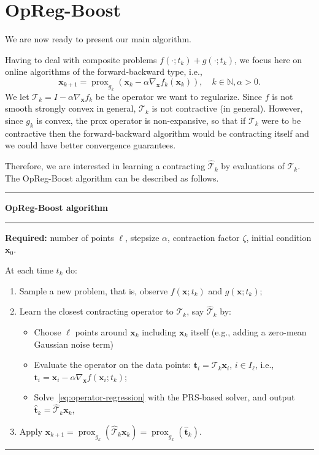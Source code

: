 \documentclass{article}
\DeclareMathOperator{\prox}{prox}
\newcommand{\N}{\mathbb{N}}
\newcommand{\tv}{\mathbold{t}}
\newcommand{\x}{\mathbold{x}}
\newcommand{\T}{\mathcal{T}}
\begin{document}
\section{OpReg-Boost}\label{sec:online-opreg}

We are now ready to present our main algorithm. 

Having to deal with composite problems $f(\cdot; t_k) + g(\cdot; t_k)$, we focus here on online algorithms of the forward-backward type, i.e., 
\begin{equation}
\x_{k+1} = \prox_{g_k} (\x_k - \alpha \nabla_{\x} f_k(\x_k)), \quad k \in \N, \alpha >0.
\end{equation}
We let $\T_k = I - \alpha \nabla_{\x} f_k$ be the operator we want to regularize. Since $f$ is not smooth strongly convex in general, $\T_k$ is not contractive (in general). However, since $g_k$ is convex, the prox operator is non-expansive, so that if $\T_k$ were to be contractive then the forward-backward algorithm would be contracting itself and we could have better convergence guarantees. 

Therefore, we are interested in learning a contracting $\hat{\T}_k$ by evaluations of $\T_k$. The OpReg-Boost algorithm can be described as follows. 

\smallskip
\smallskip
\hrule
{\bf OpReg-Boost algorithm}
\smallskip
\hrule
{\bf Required:} number of points $\ell$, stepsize $\alpha$, contraction factor $\zeta$, initial condition $\x_0$.

At each time $t_k$ do:
\begin{enumerate}
	\item Sample a new problem, that is, observe $f(\x; t_k)$ and $g(\x; t_k)$;
	\item Learn the closest contracting operator to $\T_{k}$, say $\hat{\T}_k$ by:
	\begin{itemize}
		\item Choose $\ell$ points around $\x_k$ including $\x_k$ itself (e.g., adding a zero-mean Gaussian noise term)
		\item Evaluate the operator on the data points: $\tv_i = \T_{k} \x_i$, $i\in I_{\ell}$, i.e., $\tv_i = \x_i - \alpha \nabla_{\x} f(\x_i; t_k)$;
		\item Solve~\eqref{eq:operator-regression} with the PRS-based solver, and output $\hat{\tv}_k = \hat{\T}_k \x_k$,
\end{itemize}
	\item Apply $\x_{k+1} = \prox_{g_k} (\hat{\T}_k \x_k) = \prox_{g_k} (\hat{\tv}_k) $.
\end{enumerate}
\smallskip
\hrule
\end{document}
